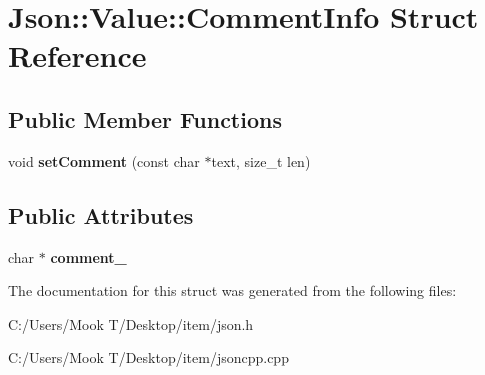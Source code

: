 \hypertarget{struct_json_1_1_value_1_1_comment_info}{}\section{Json\+:\+:Value\+:\+:Comment\+Info Struct Reference}
\label{struct_json_1_1_value_1_1_comment_info}
\subsection*{Public Member Functions}
\begin{DoxyCompactItemize}
\item 
\hypertarget{struct_json_1_1_value_1_1_comment_info_a4d01c2cd8c07995969c5d636dfd4fa8c}{}void {\bfseries set\+Comment} (const char $\ast$text, size\+\_\+t len)\label{struct_json_1_1_value_1_1_comment_info_a4d01c2cd8c07995969c5d636dfd4fa8c}

\end{DoxyCompactItemize}
\subsection*{Public Attributes}
\begin{DoxyCompactItemize}
\item 
\hypertarget{struct_json_1_1_value_1_1_comment_info_a020f19c7098bab8ec8fec14cd1a5afb9}{}char $\ast$ {\bfseries comment\+\_\+}\label{struct_json_1_1_value_1_1_comment_info_a020f19c7098bab8ec8fec14cd1a5afb9}

\end{DoxyCompactItemize}


The documentation for this struct was generated from the following files\+:\begin{DoxyCompactItemize}
\item 
C\+:/\+Users/\+Mook T/\+Desktop/item/json.\+h\item 
C\+:/\+Users/\+Mook T/\+Desktop/item/jsoncpp.\+cpp\end{DoxyCompactItemize}
